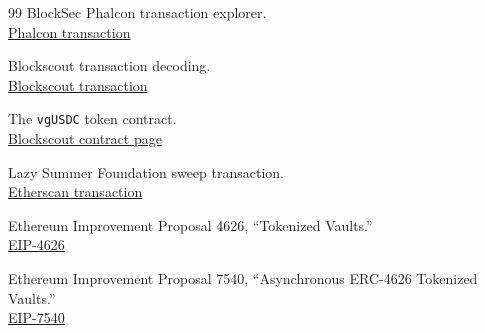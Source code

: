 \documentclass[11pt]{article}
\begin{document}
\begin{thebibliography}{99}
BlockSec Phalcon transaction explorer.\\
\href{https://app.blocksec.com/phalcon/explorer/tx/eth/0x0db528c44f23fc7fa4544684a2fab81096450a14aae8bc89f42cd0592d43da12}{Phalcon transaction}

Blockscout transaction decoding.\\
\href{https://eth.blockscout.com/tx/0x0db528c44f23fc7fa4544684a2fab81096450a14aae8bc89f42cd0592d43da12}{Blockscout transaction}

The \texttt{vgUSDC} token contract.\\
\href{https://eth.blockscout.com/address/0x8399C8Fc273bD165C346Af74A02e65f10e4FD78F}{Blockscout contract page}

Lazy Summer Foundation sweep transaction.\\
\href{https://etherscan.io/tx/0x7bead580b8d610e56949fb4162384e6e31dec24ad3b4668d8f4bddc345f14fd4}{Etherscan transaction}

Ethereum Improvement Proposal 4626, ``Tokenized Vaults.''\\
\href{https://eips.ethereum.org/EIPS/eip-4626}{EIP-4626}

Ethereum Improvement Proposal 7540, ``Asynchronous ERC-4626 Tokenized Vaults.''\\
\href{https://eips.ethereum.org/EIPS/eip-7540}{EIP-7540}

\end{thebibliography}
\end{document}
